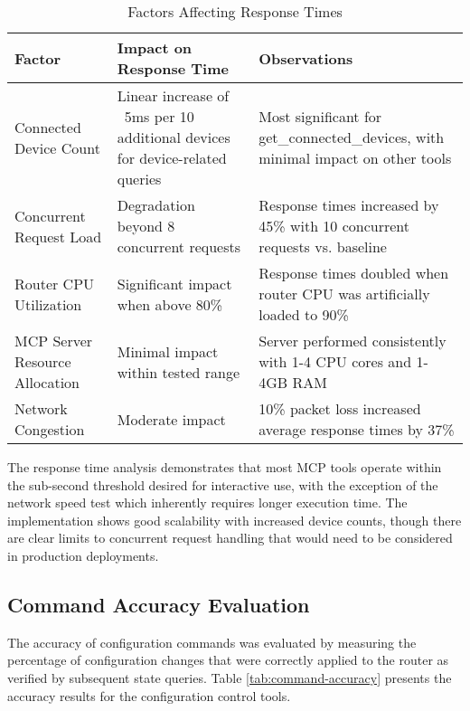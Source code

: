 \begin{table}[htbp]
\caption{Factors Affecting Response Times}
\label{tab:response-time-factors}
\begin{tabular}{|p{3.5cm}|p{5cm}|p{6cm}|}
\hline
\textbf{Factor} & \textbf{Impact on Response Time} & \textbf{Observations} \\ \hline
Connected Device Count & Linear increase of ~5ms per 10 additional devices for device-related queries & Most significant for get\_connected\_devices, with minimal impact on other tools \\ \hline
Concurrent Request Load & Degradation beyond 8 concurrent requests & Response times increased by 45\% with 10 concurrent requests vs. baseline \\ \hline
Router CPU Utilization & Significant impact when above 80\% & Response times doubled when router CPU was artificially loaded to 90\% \\ \hline
MCP Server Resource Allocation & Minimal impact within tested range & Server performed consistently with 1-4 CPU cores and 1-4GB RAM \\ \hline
Network Congestion & Moderate impact & 10\% packet loss increased average response times by 37\% \\ \hline
\end{tabular}
\end{table}

The response time analysis demonstrates that most MCP tools operate within the sub-second threshold desired for interactive use, with the exception of the network speed test which inherently requires longer execution time. The implementation shows good scalability with increased device counts, though there are clear limits to concurrent request handling that would need to be considered in production deployments.

\subsection{Command Accuracy Evaluation}
The accuracy of configuration commands was evaluated by measuring the percentage of configuration changes that were correctly applied to the router as verified by subsequent state queries. Table \ref{tab:command-accuracy} presents the accuracy results for the configuration control tools.

